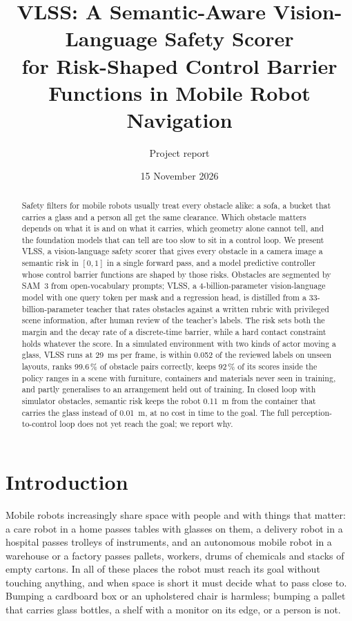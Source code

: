 \documentclass[10pt,a4paper]{article}
\title{VLSS: A Semantic-Aware Vision-Language Safety Scorer\\for Risk-Shaped Control Barrier Functions in Mobile Robot Navigation}
\author{Project report}
\date{15 November 2026}
\begin{document}
\maketitle

\begin{abstract}
Safety filters for mobile robots usually treat every obstacle alike: a sofa, a bucket that carries a glass and a person all get the
same clearance. Which obstacle matters depends on what it is and on what it carries, which geometry alone cannot tell, and the
foundation models that can tell are too slow to sit in a control loop. We present VLSS, a vision-language safety scorer that gives
every obstacle in a camera image a semantic risk in $[0,1]$ in a single forward pass, and a model predictive controller whose
control barrier functions are shaped by those risks. Obstacles are segmented by SAM~3 from open-vocabulary prompts; VLSS, a
4-billion-parameter vision-language model with one query token per mask and a regression head, is distilled from a
33-billion-parameter teacher that rates obstacles against a written rubric with privileged scene information, after human review
of the teacher's labels. The risk sets both the margin and the decay rate of a discrete-time barrier, while a hard contact
constraint holds whatever the score. In a simulated environment with two kinds of actor moving a glass, VLSS runs at 29~ms per
frame, is within 0.052 of the reviewed labels on unseen layouts, ranks 99.6\,\% of obstacle pairs correctly, keeps 92\,\% of its
scores inside the policy ranges in a scene with furniture, containers and materials never seen in training, and partly generalises
to an arrangement held out of training. In closed loop with simulator obstacles, semantic risk keeps the robot 0.11~m from the
container that carries the glass instead of 0.01~m, at no cost in time to the goal. The full perception-to-control loop does not
yet reach the goal; we report why.
\end{abstract}


\section{Introduction}

Mobile robots increasingly share space with people and with things that matter: a care robot in a home passes tables with
glasses on them, a delivery robot in a hospital passes trolleys of instruments, and an autonomous mobile robot in a warehouse or a
factory passes pallets, workers, drums of chemicals and stacks of empty cartons. In all of these places the robot must reach its
goal without touching anything, and when space is short it must decide what to pass close to. Bumping a cardboard box or an
upholstered chair is harmless; bumping a pallet that carries glass bottles, a shelf with a monitor on its edge, or a person is not.
\end{document}
